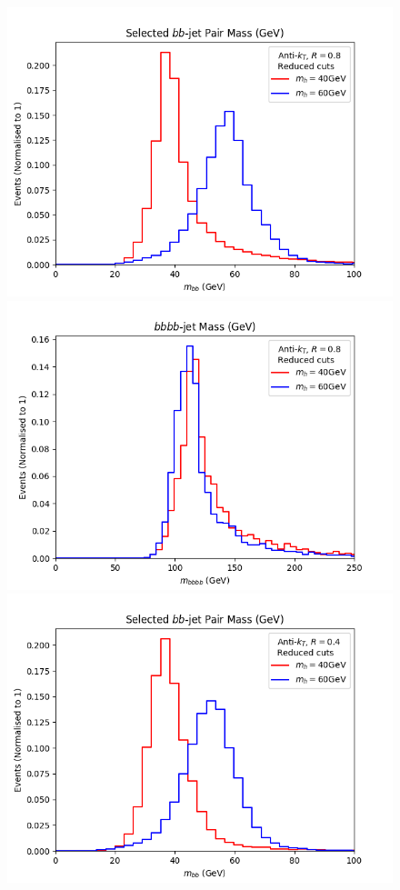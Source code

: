 \documentclass[12pt]{article}
\begin{document}

%
\begin{figure}[htb!]
	\includegraphics[scale=0.5]{plots/bbmass_AK8_lowptcut.png}
	\includegraphics[scale=0.5]{plots/bbbbmass_AK8_lowptcut.png}
	\includegraphics[scale=0.5]{plots/bbmass_AK4_lowptcut.png}

\end{figure}
\end{document}
